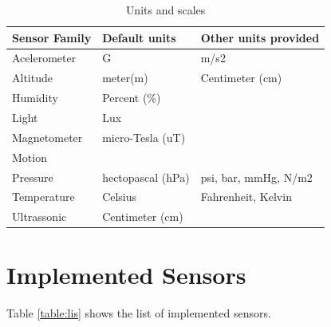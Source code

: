 \documentclass{acm_proc_article-sp}
\begin{document}
\begin{table}[hf]
\caption{Units and scales}
\centering
\label{table:units}
\begin{tabular}{|l|l|p{2.4cm}|}
\hline
\textbf{Sensor Family} & \textbf{Default units}     & \textbf{Other units provided} \\ \hline
Acelerometer  & G                 & m/s2                 \\ \hline
Altitude      & meter(m)          & Centimeter (cm)      \\ \hline
Humidity      & Percent (\%)      &                      \\ \hline
Light         & Lux               &                      \\ \hline
Magnetometer  & micro-Tesla (uT)  &                      \\ \hline
Motion        &                   &                      \\ \hline
Pressure      & hectopascal (hPa) & psi, bar, mmHg, N/m2 \\ \hline
Temperature   & Celsius           & Fahrenheit, Kelvin   \\ \hline
Ultrassonic   & Centimeter (cm)   & \\                     
\hline
\end{tabular}
\end{table}


\section{Implemented Sensors}\label{sec:Implem}
Table \ref{table:lis} shows the list of implemented sensors.
\end{document}
